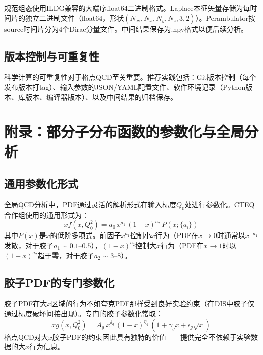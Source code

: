 \documentclass[11pt,a4paper]{ctexart}
\begin{document}
规范组态使用ILDG兼容的大端序float64二进制格式。Laplace本征矢量存储为每时间片的独立二进制文件（float64，形状$(N_{\text{ev}}, N_x, N_y, N_z, 3, 2)$）。Perambulator按source时间片分为4个Dirac分量文件。中间结果保存为.npy格式以便后续分析。

\subsection{版本控制与可重复性}

科学计算的可重复性对于格点QCD至关重要。推荐实践包括：Git版本控制（每个发布版本打tag）、输入参数的JSON/YAML配置文件、软件环境记录（Python版本、库版本、编译器版本）、以及中间结果的归档保存。

\section{附录：部分子分布函数的参数化与全局分析}

\subsection{通用参数化形式}

全局QCD分析中，PDF通过灵活的解析形式在输入标度$Q_0$处进行参数化。CTEQ合作组使用的通用形式为：
\begin{equation}
x f(x, Q_0^2) = a_0 \, x^{a_1} \, (1-x)^{a_2} \, P(x; \{a_i\})
\end{equation}
其中$P(x)$是$x$的低阶多项式。前因子$x^{a_1}$控制小$x$行为（PDF在$x \to 0$时通常以$x^{-a_1}$发散，对于胶子$a_1 \sim 0.1\text{--}0.5$），$(1-x)^{a_2}$控制大$x$行为（PDF在$x \to 1$时以$(1-x)^{a_2}$趋于零，对于胶子$a_2 \sim 3\text{--}8$）。

\subsection{胶子PDF的专门参数化}

胶子PDF在大$x$区域的行为不如夸克PDF那样受到良好实验约束（在DIS中胶子仅通过标度破坏间接出现）。专门的胶子参数化常取：
\begin{equation}
x g(x, Q_0^2) = A_g \, x^{\delta_g} \, (1-x)^{\eta_g} \, (1 + \gamma_g x + \epsilon_g \sqrt{x})
\end{equation}
格点QCD对大$x$胶子PDF的约束因此具有独特的价值——提供完全不依赖于实验数据的大$x$行为信息。
\end{document}

